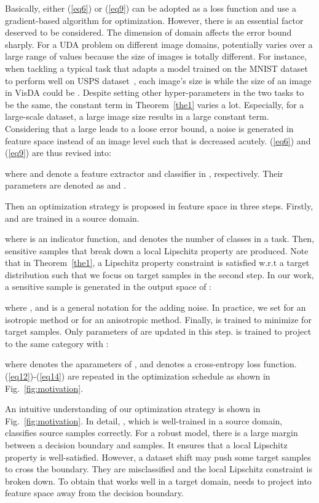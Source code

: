 \documentclass[journal,twocolumn]{IEEEtran}
\theoremstyle{definition}
\begin{document}
Basically, either (\ref{eq6}) or (\ref{eq9}) can be adopted as a loss function and use a gradient-based algorithm for optimization. However, there is an essential factor deserved to be considered. The dimension  of domain affects the error bound sharply. For a UDA problem on different image domains,  potentially varies over a large range of values because the size of images is totally different. For instance, when tackling a typical task that adapts a model trained on the MNIST dataset~\cite{726791} to perform well on USPS dataset~\cite{291440}, each image's size is  while the size of an image in VisDA could be . Despite setting other hyper-parameters in the two tasks to be the same, the constant term in Theorem~\ref{the1} varies a lot. Especially, for a large-scale dataset, a large image size results in a large constant term. Considering that a large  leads to a loose error bound, a noise  is generated in feature space instead of an image level such that  is decreased acutely. (\ref{eq6}) and (\ref{eq9}) are thus revised into:


where  and  denote a feature extractor and classifier in , respectively. Their parameters are denoted as  and .

Then an optimization strategy is proposed in feature space in three steps. Firstly,  and  are trained in a source domain.
 
where  is an indicator function, and  denotes the number of classes in a task. Then, sensitive samples that break down a local Lipschitz property are produced. Note that in Theorem~\ref{the1}, a Lipschitz property constraint is satisfied w.r.t a target distribution such that we focus on target samples in the second step. In our work, a sensitive sample  is generated in the output space of :

where , and  is a general notation for the adding noise. In practice, we set  for an isotropic method or  for an anisotropic method. Finally,  is trained to minimize  for target samples. Only parameters of  are updated in this step.  is trained to project  to the same category with :

where  denotes the aparameters of , and  denotes a cross-entropy loss function. (\ref{eq12})-(\ref{eq14}) are repeated in the optimization schedule as shown in Fig.~\ref{fig:motivation}.

An intuitive understanding of our optimization strategy is shown in Fig.~\ref{fig:motivation}. In detail, , which is well-trained in a source domain, classifies source samples correctly. For a robust model, there is a large margin between a decision boundary and samples. It ensures that a local Lipschitz property is well-satisfied. However, a dataset shift may push some target samples to cross the boundary. They are misclassified and the local Lipschitz constraint is broken down. To obtain  that works well in a target domain,  needs to project  into feature space away from the decision boundary.
\end{document}
